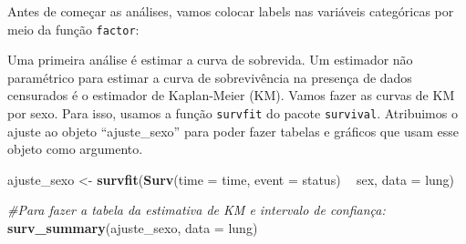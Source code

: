 \documentclass[
]{book}
\newenvironment{Shaded}{\begin{snugshade}}{\end{snugshade}}
\newcommand{\CommentTok}[1]{\textcolor[rgb]{0.56,0.35,0.01}{\textit{#1}}}
\newcommand{\DataTypeTok}[1]{\textcolor[rgb]{0.13,0.29,0.53}{#1}}
\newcommand{\KeywordTok}[1]{\textcolor[rgb]{0.13,0.29,0.53}{\textbf{#1}}}
\newcommand{\NormalTok}[1]{#1}
\newcommand{\OperatorTok}[1]{\textcolor[rgb]{0.81,0.36,0.00}{\textbf{#1}}}
\newcommand{\StringTok}[1]{\textcolor[rgb]{0.31,0.60,0.02}{#1}}
\begin{document}
Antes de começar as análises, vamos colocar labels nas variáveis categóricas por meio da função \texttt{factor}:

\begin{Shaded}
\end{Shaded}

Uma primeira análise é estimar a curva de sobrevida. Um estimador não paramétrico para estimar a curva de sobrevivência na presença de dados censurados é o estimador de Kaplan-Meier (KM).
Vamos fazer as curvas de KM por sexo. Para isso, usamos a função \texttt{survfit} do pacote \texttt{survival}. Atribuimos o ajuste ao objeto ``ajuste\_sexo'' para poder fazer tabelas e gráficos que usam esse objeto como argumento.

\begin{Shaded}
\begin{Highlighting}[]
\NormalTok{ajuste_sexo <-}\StringTok{ }\KeywordTok{survfit}\NormalTok{(}\KeywordTok{Surv}\NormalTok{(}\DataTypeTok{time =}\NormalTok{ time, }\DataTypeTok{event =}\NormalTok{ status) }\OperatorTok{~}\StringTok{ }\NormalTok{sex, }\DataTypeTok{data =}\NormalTok{ lung)}

\CommentTok{#Para fazer a tabela da estimativa de KM e intervalo de confiança:}
\KeywordTok{surv_summary}\NormalTok{(ajuste_sexo, }\DataTypeTok{data =}\NormalTok{ lung)}
\end{Highlighting}
\end{Shaded}
\end{document}
